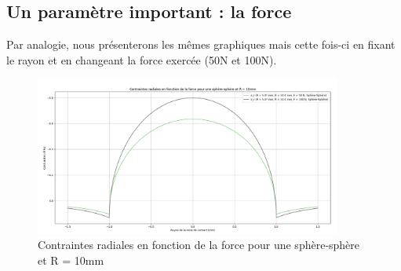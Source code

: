 \documentclass[a4paper,12pt]{article}
\begin{document}
\subsection{Un paramètre important : la force}
Par analogie, nous présenterons les mêmes graphiques mais cette fois-ci en fixant le rayon et en changeant la force exercée (50N et 100N).
\begin{figure}[H] %
	\centering
	\includegraphics[width=0.9\textwidth]{rad3.png} %
	\caption{Contraintes radiales en fonction de la force pour une sphère-sphère et R = 10mm} %
	\label{fig:mon_image7} %
\end{figure}
\end{document}
